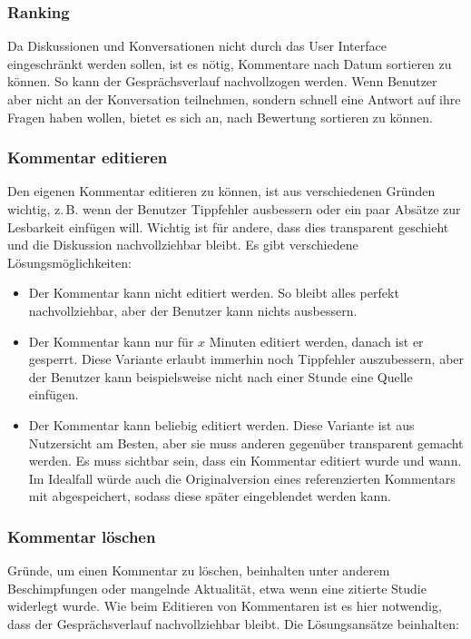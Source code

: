 \documentclass[
	headsepline,
	footsepline,
	fontsize=12pt,
	bibliography=totoc
]{scrbook}
\begin{document}
\subsubsection{Ranking}


Da Diskussionen und Konversationen nicht durch das User Interface eingeschränkt werden sollen, ist es nötig, Kommentare nach Datum sortieren zu können. So kann der Gesprächsverlauf nachvollzogen werden. Wenn Benutzer aber nicht an der Konversation teilnehmen, sondern schnell eine Antwort auf ihre Fragen haben wollen, bietet es sich an, nach Bewertung sortieren zu können.

\subsubsection{Kommentar editieren}

Den eigenen Kommentar editieren zu können, ist aus verschiedenen Gründen wichtig, z.\,B. wenn der Benutzer Tippfehler ausbessern oder ein paar Absätze zur Lesbarkeit einfügen will. Wichtig ist für andere, dass dies transparent geschieht und die Diskussion nachvollziehbar bleibt. Es gibt verschiedene Lösungsmöglichkeiten:

\begin{itemize}
	\item Der Kommentar kann nicht editiert werden. So bleibt alles perfekt nachvollziehbar, aber der Benutzer kann nichts ausbessern.
	\item Der Kommentar kann nur für $x$ Minuten editiert werden, danach ist er gesperrt. Diese Variante erlaubt immerhin noch Tippfehler auszubessern, aber der Benutzer kann beispielsweise nicht nach einer Stunde eine Quelle einfügen.
	\item Der Kommentar kann beliebig editiert werden. Diese Variante ist aus Nutzersicht am Besten, aber sie muss anderen gegenüber transparent gemacht werden. Es muss sichtbar sein, dass ein Kommentar editiert wurde und wann. Im Idealfall würde auch die Originalversion eines referenzierten Kommentars mit abgespeichert, sodass diese später eingeblendet werden kann.
\end{itemize}

\subsubsection{Kommentar löschen}

Gründe, um einen Kommentar zu löschen, beinhalten unter anderem Beschimpfungen oder mangelnde Aktualität, etwa wenn eine zitierte Studie widerlegt wurde. Wie beim Editieren von Kommentaren ist es hier notwendig, dass der Gesprächsverlauf nachvollziehbar bleibt. Die Lösungsansätze beinhalten:
\end{document}
